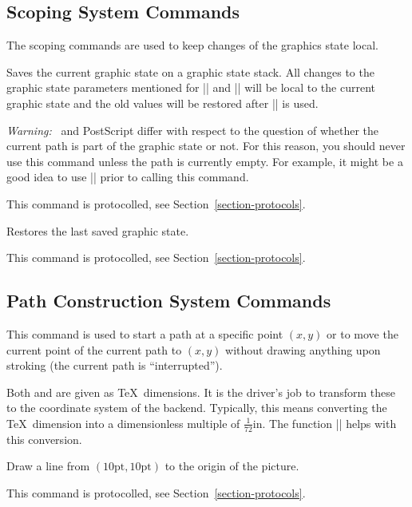 \subsection{Scoping System Commands}

The scoping commands are used to keep changes of the graphics state
local.

\begin{command}{\pgfsys@beginscope}
  Saves the current graphic state on a graphic state stack. All
  changes to the graphic state parameters mentioned for |\pgfsys@stroke|
  and |\pgfsys@fill| will be local to the current graphic state and
  the old values will be restored after |\pgfsys@endscope| is used.

  \emph{Warning:} \pdf\ and PostScript differ with respect to the
  question of whether the current path is part of the graphic state or
  not. For this reason, you should never use this command unless the
  path is currently empty. For example, it might be a good idea to use
  |\pgfsys@discardpath| prior to calling this command.

  This command is protocolled, see Section~\ref{section-protocols}.
\end{command}

\begin{command}{\pgfsys@endscope}
  Restores the last saved graphic state.

  This command is protocolled, see Section~\ref{section-protocols}.
\end{command}




\subsection{Path Construction System Commands}

\begin{command}{\pgfsys@moveto{}}
  This command is used to start a path at a specific point
  $(x,y)$ or to move the current point of the current path to  $(x,y)$
  without drawing anything upon stroking (the current path is
  ``interrupted'').

  Both  and  are given as \TeX\ dimensions. It is the
  driver's job to transform these to the coordinate system of the
  backend. Typically, this means converting the \TeX\ dimension into a
  dimensionless multiple of $\frac{1}{72}\mathrm{in}$. The function
  |\pgf@sys@bp| helps with this conversion.

  \example Draw a line from $(10\mathrm{pt},10\mathrm{pt})$ to the
  origin of the picture.
\begin{codeexample}
\pgfsys@moveto{10pt}{10pt}
\pgfsys@lineto{0pt}{0pt}
\pgfsys@stroke
\end{codeexample}

  This command is protocolled, see Section~\ref{section-protocols}.
\end{command}


